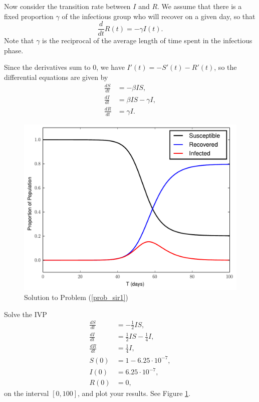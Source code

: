 Now consider the transition rate between $I$ and $R$.
We assume that there is a fixed proportion $\gamma$ of the infectious group who will recover on a given day, so that
\[\frac{d}{dt}R(t) = -\gamma I(t).\]
Note that $\gamma$ is the reciprocal of the average length of time spent in the infectious phase.

Since the derivatives sum to $0$, we have $I'(t) = - S'(t) - R'(t)$, so the  differential equations are given by
\begin{align*}
\frac{dS}{dt} &=-\beta IS ,\\
\frac{dI}{dt} &= \beta I S-\gamma I,\\
\frac{dR}{dt} &=\gamma I.
\end{align*}


\begin{figure}[ht]
\centering
\includegraphics[width=\textwidth]{SIR1.pdf}
\caption{Solution to Problem (\ref{prob_sir1})}
\label{sir1}
\end{figure}


\begin{problem}
Solve the IVP
\begin{align*}
\frac{dS}{dt} &=-\frac{1}{2} IS ,\\
\frac{dI}{dt} &= \frac{1}{2} I S-\frac{1}{4} I, \\
\frac{dR}{dt} &=\frac{1}{4} I,\\
S(0) &= 1-6.25\cdot10^{-7},\\
I(0) &= 6.25\cdot10^{-7},\\
R(0) &=0,
\end{align*}
on the interval $[0,100]$, and plot your results.  See Figure \ref{sir1}. \label{prob_sir1}
\end{problem}



